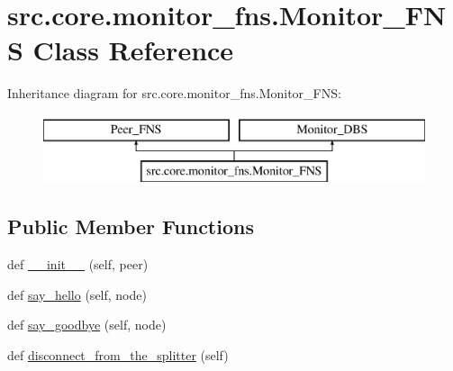 \hypertarget{classsrc_1_1core_1_1monitor__fns_1_1Monitor__FNS}{}\section{src.\+core.\+monitor\+\_\+fns.\+Monitor\+\_\+\+F\+N\+S Class Reference}
\label{classsrc_1_1core_1_1monitor__fns_1_1Monitor__FNS}
Inheritance diagram for src.\+core.\+monitor\+\_\+fns.\+Monitor\+\_\+\+F\+N\+S\+:\begin{figure}[H]
\begin{center}
\leavevmode
\includegraphics[height=2.000000cm]{classsrc_1_1core_1_1monitor__fns_1_1Monitor__FNS}
\end{center}
\end{figure}
\subsection*{Public Member Functions}
\begin{DoxyCompactItemize}
\item 
def \hyperlink{classsrc_1_1core_1_1monitor__fns_1_1Monitor__FNS_a8ef57d6be91a904455b027b81a0fa6d1}{\+\_\+\+\_\+init\+\_\+\+\_\+} (self, peer)
\item 
def \hyperlink{classsrc_1_1core_1_1monitor__fns_1_1Monitor__FNS_af3d7aea010da0326593d61763337d8b8}{say\+\_\+hello} (self, node)
\item 
def \hyperlink{classsrc_1_1core_1_1monitor__fns_1_1Monitor__FNS_acbbb9c80f3d7224f07d08aac5e06a0ea}{say\+\_\+goodbye} (self, node)
\item 
def \hyperlink{classsrc_1_1core_1_1monitor__fns_1_1Monitor__FNS_a5147f0b68fcf31d81f2c6ec2d5cb7eb3}{disconnect\+\_\+from\+\_\+the\+\_\+splitter} (self)
\end{DoxyCompactItemize}
